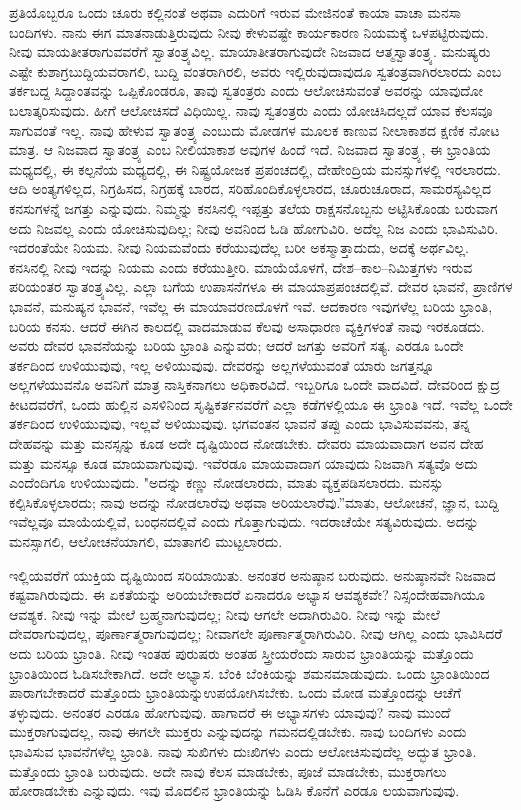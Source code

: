ಪ್ರತಿಯೊಬ್ಬರೂ ಒಂದು ಚೂರು ಕಲ್ಲಿನಂತೆ ಅಥವಾ ಎದುರಿಗೆ ಇರುವ ಮೇಜಿನಂತೆ ಕಾಯಾ ವಾಚಾ ಮನಸಾ ಬಂದಿಗಳು. ನಾನು ಈಗ ಮಾತನಾಡುತ್ತಿರುವುದು ನೀವು ಕೇಳುವಷ್ಟೇ ಕಾರ್ಯಕಾರಣ ನಿಯಮಕ್ಕೆ ಒಳಪಟ್ಟಿರುವುದು. ನೀವು ಮಾಯತೀತರಾಗುವವರೆಗೆ ಸ್ವಾತಂತ್ರ್ಯವಿಲ್ಲ. ಮಾಯಾತೀತರಾಗುವುದೇ ನಿಜವಾದ ಆತ್ಮಸ್ವಾತಂತ್ರ್ಯ. ಮನುಷ್ಯರು ಎಷ್ಟೇ ಕುಶಾಗ್ರಬುದ್ದಿಯವರಾಗಲಿ, ಬುದ್ದಿ ವಂತರಾಗಿರಲಿ, ಅವರು ಇಲ್ಲಿರುವುದಾವುದೂ ಸ್ವತಂತ್ರವಾಗಿರಲಾರದು ಎಂಬ ತರ್ಕಬದ್ದ ಸಿದ್ದಾಂತವನ್ನು ಒಪ್ಪಿಕೊಂಡರೂ, ತಾವು ಸ್ವತಂತ್ರರು ಎಂದು ಆಲೋಚಿಸುವಂತೆ ಅವರನ್ನು ಯಾವುದೋ ಬಲಾತ್ಕರಿಸುವುದು. ಹೀಗೆ ಆಲೋಚಿಸದೆ ವಿಧಿಯಿಲ್ಲ. ನಾವು ಸ್ವತಂತ್ರರು ಎಂದು ಯೋಚಿಸಿದಲ್ಲದೆ ಯಾವ ಕೆಲಸವೂ ಸಾಗುವಂತೆ ಇಲ್ಲ. ನಾವು ಹೇಳುವ ಸ್ವಾತಂತ್ರ್ಯ ಎಂಬುದು ಮೋಡಗಳ ಮೂಲಕ ಕಾಣುವ ನೀಲಾಕಾಶದ ಕ್ಷಣಿಕ ನೋಟ ಮಾತ್ರ. ಆ ನಿಜವಾದ ಸ್ವಾತಂತ್ರ್ಯ ಎಂಬ ನೀಲಿಯಾಕಾಶ ಅವುಗಳ ಹಿಂದೆ ಇದೆ. ನಿಜವಾದ ಸ್ವಾತಂತ್ರ್ಯ, ಈ ಭ್ರಾಂತಿಯ ಮಧ್ಯದಲ್ಲಿ, ಈ ಕಲ್ಪನೆಯ ಮಧ್ಯದಲ್ಲಿ, ಈ ನಿಷ್ಟ್ರಯೋಜಕ ಪ್ರಪಂಚದಲ್ಲಿ, ದೇಹೇಂದ್ರಿಯ ಮನಸ್ಸುಗಳಲ್ಲಿ ಇರಲಾರದು. ಆದಿ ಅಂತ್ಯಗಳಿಲ್ಲದ, ನಿಗ್ರಹಿಸದ, ನಿಗ್ರಹಕ್ಕೆ ಬಾರದ, ಸರಿಹೊಂದಿಕೊಳ್ಳಲಾರದ, ಚೂರುಚೂರಾದ, ಸಾಮರಸ್ಯವಿಲ್ಲದ ಕನಸುಗಳನ್ನೆ ಜಗತ್ತು ಎನ್ನುವುದು. ನಿಮ್ಮನ್ನು ಕನಸಿನಲ್ಲಿ ಇಪ್ಪತ್ತು ತಲೆಯ ರಾಕ್ಷಸನೊಬ್ಬನು ಅಟ್ಟಿಸಿಕೊಂಡು ಬರುವಾಗ ಅದು ನಿಜವಲ್ಲ ಎಂದು ಯೋಚಿಸುವುದಿಲ್ಲ; ನೀವು ಅವನಿಂದ ಓಡಿ ಹೋಗುವಿರಿ. ಅದೆಲ್ಲ ನಿಜ ಎಂದು ಭಾವಿಸುವಿರಿ. ಇದರಂತೆಯೇ ನಿಯಮ. ನೀವು ನಿಯಮವೆಂದು ಕರೆಯುವುದೆಲ್ಲ ಬರೀ ಅಕಸ್ಮಾತ್ತಾದುದು, ಅದಕ್ಕೆ ಅರ್ಥವಿಲ್ಲ. ಕನಸಿನಲ್ಲಿ ನೀವು ಇದನ್ನು ನಿಯಮ ಎಂದು ಕರೆಯುತ್ತೀರಿ. ಮಾಯೆಯೊಳಗೆ, ದೇಶ–ಕಾಲ–ನಿಮಿತ್ತಗಳು ಇರುವ ಪರಿಯಂತರ ಸ್ವಾತಂತ್ರ್ಯವಿಲ್ಲ. ಎಲ್ಲಾ ಬಗೆಯ ಉಪಾಸನೆಗಳೂ ಈ ಮಾಯಾಪ್ರಪಂಚದಲ್ಲಿವೆ. ದೇವರ ಭಾವನೆ, ಪ್ರಾಣಿಗಳ ಭಾವನೆ, ಮನುಷ್ಯನ ಭಾವನೆ, ಇವೆಲ್ಲ ಈ ಮಾಯಾವರಣದೊಳಗೆ ಇವೆ. ಆದಕಾರಣ ಇವುಗಳೆಲ್ಲ ಬರಿಯ ಭ್ರಾಂತಿ, ಬರಿಯ ಕನಸು. ಆದರೆ ಈಗಿನ ಕಾಲದಲ್ಲಿ ವಾದಮಾಡುವ ಕೆಲವು ಅಸಾಧಾರಣ ವ್ಯಕ್ತಿಗಳಂತೆ ನಾವು ಇರಕೂಡದು. ಅವರು ದೇವರ ಭಾವನೆಯನ್ನು ಬರಿಯ ಭ್ರಾಂತಿ ಎನ್ನುವರು; ಆದರೆ ಜಗತ್ತು ಅವರಿಗೆ ಸತ್ಯ. ಎರಡೂ ಒಂದೇ ತರ್ಕದಿಂದ ಉಳಿಯುವುವು, ಇಲ್ಲ ಅಳಿಯುವುವು. ದೇವರನ್ನು ಅಲ್ಲಗಳೆಯುವಂತೆ ಯಾರು ಜಗತ್ತನ್ನೂ ಅಲ್ಲಗಳೆಯುವನೊ ಅವನಿಗೆ ಮಾತ್ರ ನಾಸ್ತಿಕನಾಗಲು ಅಧಿಕಾರವಿದೆ. ಇಬ್ಬರಿಗೂ ಒಂದೇ ವಾದವಿದೆ. ದೇವರಿಂದ ಕ್ಷುದ್ರ ಕೀಟದವರೆಗೆ, ಒಂದು ಹುಲ್ಲಿನ ಎಸಳಿನಿಂದ ಸೃಷ್ಟಿಕರ್ತನವರೆಗೆ ಎಲ್ಲಾ ಕಡೆಗಳಲ್ಲಿಯೂ ಈ ಭ್ರಾಂತಿ ಇದೆ. ಇವೆಲ್ಲ ಒಂದೇ ತರ್ಕದಿಂದ ಉಳಿಯುವುವು, ಇಲ್ಲವೆ ಅಳಿಯುವುವು. ಭಗವಂತನ ಭಾವನೆ ತಪ್ಪು ಎಂದು ಭಾವಿಸುವವನು, ತನ್ನ ದೇಹವನ್ನು ಮತ್ತು ಮನಸ್ಸನ್ನು ಕೂಡ ಅದೇ ದೃಷ್ಟಿಯಿಂದ ನೋಡಬೇಕು. ದೇವರು ಮಾಯವಾದಾಗ ಅವನ ದೇಹ ಮತ್ತು ಮನಸ್ಸೂ ಕೂಡ ಮಾಯವಾಗುವುವು. ಇವೆರಡೂ ಮಾಯವಾದಾಗ ಯಾವುದು ನಿಜವಾಗಿ ಸತ್ಯವೊ ಅದು ಎಂದೆಂದಿಗೂ ಉಳಿಯುವುದು. "ಅದನ್ನು ಕಣ್ಣು ನೋಡಲಾರದು, ಮಾತು ವ್ಯಕ್ತಪಡಿಸಲಾರದು. ಮನಸ್ಸು ಕಲ್ಪಿಸಿಕೊಳ್ಳಲಾರದು; ನಾವು ಅದನ್ನು ನೋಡಲಾರೆವು ಅಥವಾ ಅರಿಯಲಾರೆವು.''ಮಾತು, ಆಲೋಚನೆ, ಜ್ಞಾನ, ಬುದ್ದಿ ಇವೆಲ್ಲವೂ ಮಾಯೆಯಲ್ಲಿವೆ, ಬಂಧನದಲ್ಲಿವೆ ಎಂದು ಗೊತ್ತಾಗುವುದು. ಇದರಾಚೆಯೇ ಸತ್ಯವಿರುವುದು. ಅದನ್ನು ಮನಸ್ಸಾಗಲಿ, ಆಲೋಚನೆಯಾಗಲಿ, ಮಾತಾಗಲಿ ಮುಟ್ಟಲಾರದು.

ಇಲ್ಲಿಯವರೆಗೆ ಯುಕ್ತಿಯ ದೃಷ್ಟಿಯಿಂದ ಸರಿಯಾಯಿತು. ಅನಂತರ ಅನುಷ್ಠಾನ ಬರುವುದು. ಅನುಷ್ಠಾನವೇ ನಿಜವಾದ ಕಷ್ಟವಾಗಿರುವುದು. ಈ ಏಕತೆಯನ್ನು ಅರಿಯಬೇಕಾದರೆ ಏನಾದರೂ ಅಭ್ಯಾಸ ಆವಶ್ಯಕವೇ? ನಿಸ್ಸಂದೇಹವಾಗಿಯೂ ಆವಶ್ಯಕ. ನೀವು ಇನ್ನು ಮೇಲೆ ಬ್ರಹ್ಮನಾಗುವುದಲ್ಲ; ನೀವು ಆಗಲೇ ಅದಾಗಿರುವಿರಿ. ನೀವು ಇನ್ನು ಮೇಲೆ ದೇವರಾಗುವುದಲ್ಲ, ಪೂರ್ಣಾತ್ಮರಾಗುವುದಲ್ಲ; ನೀವಾಗಲೇ ಪೂರ್ಣಾತ್ಮರಾಗಿರುವಿರಿ. ನೀವು ಆಗಿಲ್ಲ ಎಂದು ಭಾವಿಸಿದರೆ ಅದು ಬರಿಯ ಭ್ರಾಂತಿ. ನೀವು ಇಂತಹ ಪುರುಷರು ಅಂತಹ ಸ್ತ್ರೀಯರೆಂದು ಸಾರುವ ಭ್ರಾಂತಿಯನ್ನು ಮತ್ತೊಂದು ಭ್ರಾಂತಿಯಿಂದ ಓಡಿಸಬೇಕಾಗಿದೆ. ಅದೇ ಅಭ್ಯಾಸ. ಬೆಂಕಿ ಬೆಂಕಿಯನ್ನು ಶಮನಮಾಡುವುದು. ಒಂದು ಭ್ರಾಂತಿಯಿಂದ ಪಾರಾಗಬೇಕಾದರೆ ಮತ್ತೊಂದು ಭ್ರಾಂತಿಯನ್ನು\break ಉಪಯೋಗಿಸಬೇಕು. ಒಂದು ಮೋಡ ಮತ್ತೊಂದನ್ನು ಆಚೆಗೆ ತಳ್ಳುವುದು. ಅನಂತರ ಎರಡೂ ಹೋಗುವುವು. ಹಾಗಾದರೆ ಈ ಅಭ್ಯಾಸಗಳು ಯಾವುವು? ನಾವು ಮುಂದೆ ಮುಕ್ತರಾಗುವುದಲ್ಲ, ನಾವು ಈಗಲೇ ಮುಕ್ತರು ಎನ್ನುವುದನ್ನು ಗಮನದಲ್ಲಿಡಬೇಕು. ನಾವು ಬಂದಿಗಳು ಎಂದು ಭಾವಿಸುವ ಭಾವನೆಗಳೆಲ್ಲ ಭ್ರಾಂತಿ. ನಾವು ಸುಖಿಗಳು ದುಃಖಿಗಳು ಎಂದು ಆಲೋಚಿಸುವುದೆಲ್ಲ ಅದ್ಭುತ ಭ್ರಾಂತಿ. ಮತ್ತೊಂದು ಭ್ರಾಂತಿ ಬರುವುದು. ಅದೇ ನಾವು ಕೆಲಸ ಮಾಡಬೇಕು, ಪೂಜೆ ಮಾಡಬೇಕು, ಮುಕ್ತರಾಗಲು ಹೋರಾಡಬೇಕು ಎನ್ನುವುದು. ಇವು ಮೊದಲಿನ ಭ್ರಾಂತಿಯನ್ನು ಓಡಿಸಿ ಕೊನೆಗೆ ಎರಡೂ ಲಯವಾಗುವುವು.

